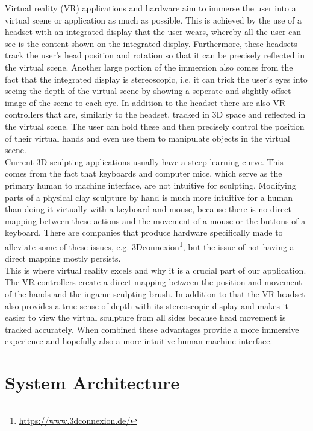 Virtual reality (VR) applications and hardware aim to immerse the user into a virtual scene or application as much as possible. This is achieved by the use of a headset with an integrated display that the user wears, whereby all the user can see is the content shown on the integrated display. Furthermore, these headsets track the user's head position and rotation so that it can be precisely reflected in the virtual scene. Another large portion of the immersion also comes from the fact that the integrated display is stereoscopic, i.e. it can trick the user's eyes into seeing the depth of the virtual scene by showing a seperate and slightly offset image of the scene to each eye. In addition to the headset there are also VR controllers that are, similarly to the headset, tracked in 3D space and reflected in the virtual scene. The user can hold these and then precisely control the position of their virtual hands and even use them to manipulate objects in the virtual scene.\\
Current 3D sculpting applications usually have a steep learning curve. This comes from the fact that keyboards and computer mice, which serve as the primary human to machine interface, are not intuitive for
sculpting. Modifying parts of a physical clay sculpture by hand is much more intuitive for a human than doing it virtually with a keyboard and mouse, because there is no direct mapping between these actions
and the movement of a mouse or the buttons of a keyboard. There are companies that produce hardware specifically made to alleviate some of these issues, e.g. 3Dconnexion\footnote{\url{https://www.3dconnexion.de/}}, but the issue
of not having a direct mapping mostly persists.\\
This is where virtual reality excels and why it is a crucial part of our application. The VR controllers create a direct mapping between the position and movement of the hands and the ingame sculpting brush. In addition to that
the VR headset also provides a true sense of depth with its stereoscopic display and makes it easier to view the virtual sculpture from all sides because head movement is tracked accurately. When combined these advantages provide
a more immersive experience and hopefully also a more intuitive human machine interface.

\section{System Architecture}

